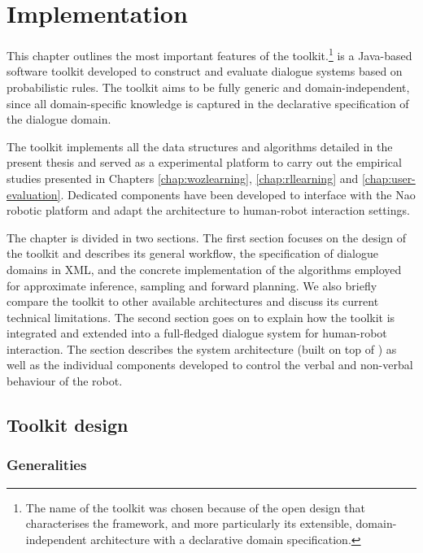 \chapter{Implementation}
\label{chap:opendial}

This chapter outlines the most important features of the \opendial toolkit.\footnote{The name of the toolkit was chosen because of the open design that characterises the framework, and more particularly its extensible, domain-independent architecture with a declarative domain specification.} \opendial is a Java-based software toolkit developed to construct and evaluate dialogue systems based on probabilistic rules. The toolkit aims to be fully generic and domain-independent, since all domain-specific knowledge is captured in the declarative specification of the dialogue domain.

The toolkit implements all the data structures and algorithms detailed in the present thesis and served as a experimental platform to carry out the empirical studies presented in Chapters \ref{chap:wozlearning}, \ref{chap:rllearning} and \ref{chap:user-evaluation}. Dedicated components have been developed to interface \opendial with the Nao robotic platform and adapt the architecture to human-robot interaction settings.

The chapter is divided in two sections.  The first section focuses on the design of the \opendial toolkit and describes its general workflow, the specification of dialogue domains in XML, and the concrete implementation of the algorithms employed for approximate inference, sampling and forward planning. We also briefly compare the toolkit to other available architectures and discuss its current technical limitations.  The second section goes on to explain how the toolkit is integrated and extended into a full-fledged dialogue system for human-robot interaction. The section describes the system architecture (built on top of \opendial$\!\!$) as well as the individual components developed to control the verbal and non-verbal behaviour of the robot.  

\section{Toolkit design}
\label{sec:genarchitecture}

\subsection{Generalities}

